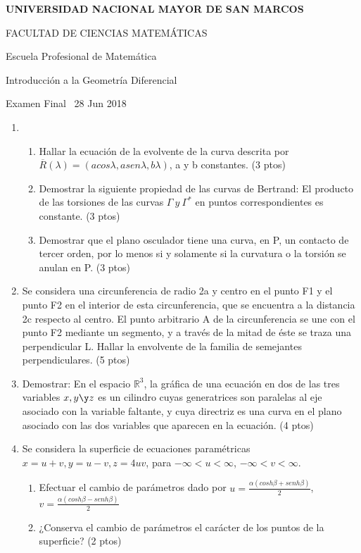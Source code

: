 \documentclass{article}
\begin{document}
  
  \begin{center}
    \bfseries\large
    UNIVERSIDAD NACIONAL MAYOR DE SAN MARCOS
    
    FACULTAD DE CIENCIAS MATEMÁTICAS
    
    Escuela Profesional de Matemática
    
    Introducción a la Geometría Diferencial 
    
    Examen Final \qquad \  28 Jun 2018
  
    \bigskip
  
  \end{center}
  
  \noindent
  \begin{enumerate}
      \item 
      \begin{enumerate}
          \item
          Hallar la ecuación de la evolvente de la curva descrita por \break $\overline{R}(\lambda)=(acos\lambda,asen\lambda, b\lambda)$, a y b constantes. \quad (3 ptos)
          \item
          Demostrar la siguiente propiedad de las curvas de Bertrand: El producto de las torsiones de las curvas $\Gamma \ y \ \Gamma ^{*}$ en puntos correspondientes es constante. \quad (3 ptos)
          \item
          Demostrar que el plano osculador tiene una curva, en P, un contacto de tercer orden, por lo menos si y solamente si la curvatura o la torsión se anulan en P. \quad (3 ptos)
      \end{enumerate}
      \item
      Se considera una circunferencia de radio 2a y centro en el punto F1 y el punto F2 en el interior de esta circunferencia, que se encuentra a la distancia 2c respecto al centro. El punto arbitrario A de la circunferencia se une con el punto F2 mediante un segmento, y a través de la mitad de éste se traza una perpendicular L. Hallar la envolvente de la familia de semejantes perpendiculares. \quad (5 ptos)
      \item
      Demostrar: En el espacio $\mathbb{R}^3$, la gráfica de una ecuación en dos de las tres variables $x, y \y z $ es un cilindro cuyas generatrices son paralelas al eje asociado con la variable faltante, y cuya directriz es una curva en el plano asociado con las dos variables que aparecen en la ecuación. \quad (4 ptos)
      \item
      Se considera la superficie de ecuaciones paramétricas $x=u+v, y=u-v, z=4uv$, para $-\infty<u<\infty$, $-\infty<v<\infty$.
      \begin{enumerate}
          \item Efectuar el cambio de parámetros dado por $u=\frac{\alpha(cosh\beta+senh\beta)}{2}$, \break $v=\frac{\alpha(cosh\beta-senh\beta)}{2}$
          \item ¿Conserva el cambio de parámetros el carácter de los puntos de la superficie? \quad (2 ptos)
      \end{enumerate}
  \end{enumerate}
  
\end{document}
